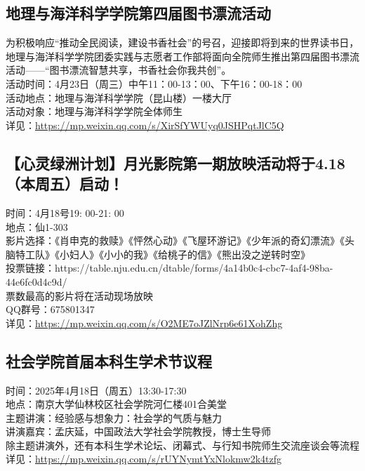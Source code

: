 \documentclass[letterpaper, 12pt]{article}
\begin{document}
\begin{multicols}{2}
\subsection{地理与海洋科学学院第四届图书漂流活动}
为积极响应“推动全民阅读，建设书香社会”的号召，迎接即将到来的世界读书日，地理与海洋科学学院团委实践与志愿者工作部将面向全院师生推出第四届图书漂流活动——“图书漂流智慧共享，书香社会你我共创”。
\\活动时间：4月23日（周三）中午11：00-13：00、下午16：00-18：00
\\活动地点：地理与海洋科学学院（昆山楼）一楼大厅
\\活动对象：地理与海洋科学学院全体师生
\\详见：\url{https://mp.weixin.qq.com/s/XirSfYWUyq0JSHPqtJlC5Q}
\subsection{【心灵绿洲计划】月光影院第一期放映活动将于4.18（本周五）启动！}
时间：4月18号19: 00-21: 00
\\地点：仙1-303
\\影片选择：《肖申克的救赎》《怦然心动》《飞屋环游记》《少年派的奇幻漂流》《头脑特工队》《小妇人》《小小的我》《给桃子的信》《熊出没之逆转时空》
\\投票链接：https://table.nju.edu.cn/dtable/forms/4a14b0c4-cbc7-4af4-98ba-44e6fc0d4c9d/
\\票数最高的影片将在活动现场放映
\\QQ群号：675801347
\\详见：\url{https://mp.weixin.qq.com/s/O2ME7oJZlNrp6e61XohZhg}
\subsection{社会学院首届本科生学术节议程}
时间：2025年4月18日（周五）13:30-17:30
\\地点：南京大学仙林校区社会学院河仁楼401合美堂
\\主题讲演：经验感与想象力：社会学的气质与魅力
\\讲演嘉宾：孟庆延，中国政法大学社会学院教授，博士生导师
\\除主题讲演外，还有本科生学术论坛、闭幕式、与行知书院师生交流座谈会等流程
\\详见：\url{https://mp.weixin.qq.com/s/rUYNymtYxNlokmw2k4tzfg}

\end{multicols}
\end{document}
